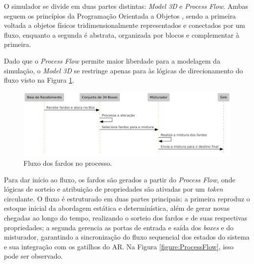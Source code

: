 \documentclass[
    12pt,                %
    openright,           %
    oneside,             %
    a4paper,             %
    english,             %
    spanish,             %
    brazil               %
]{ufscar}
\begin{document}
O simulador se divide em duas partes distintas: \textit{Model 3D} e \textit{Process Flow}. Ambas seguem os princípios da Programação Orientada a Objetos \cite{poo_1982}, sendo a primeira voltada a objetos físicos tridimensionalmente representados e conectados por um fluxo, enquanto a segunda é abstrata, organizada por blocos e complementar à primeira.

Dado que o \textit{Process Flow} permite maior liberdade para a modelagem da simulação, o \textit{Model 3D} se restringe apenas para às lógicas de direcionamento do fluxo visto na Figura \ref{figure:fluxoUML}.

\begin{figure}[hbt]
\centering
  \caption{Fluxo dos fardos no processo.}
  \label{figure:fluxoUML}
  \includegraphics[width=1\textwidth]{figures/fluxoUML.png}
\end{figure}

Para dar início ao fluxo, os fardos são gerados a partir do \textit{Process Flow}, onde lógicas de sorteio e atribuição de propriedades são ativadas por um \textit{token} circulante. O fluxo é estruturado em duas partes principais: a primeira reproduz o estoque inicial da abordagem estática e determinística, além de gerar novas chegadas ao longo do tempo, realizando o sorteio dos fardos e de suas respectivas propriedades; a segunda gerencia as portas de entrada e saída dos \textit{boxes} e do misturador, garantindo a sincronização do fluxo sequencial dos estados do sistema e sua integração com os gatilhos do AR. Na Figura \ref{figure:ProcessFlow}, isso pode ser observado.
\end{document}
